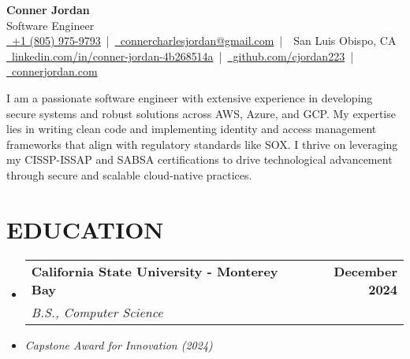 \documentclass[letterpaper,10pt]{article}
\makeatletter
\newcommand{\resumeSubHeadingListStart}{\begin{itemize}[leftmargin=0in,label={}]}
\newcommand{\resumeSubHeadingListEnd}{\end{itemize}}
\newcommand{\resumeSubheading}[4]{%
  \vspace{-2pt}\item
  \begin{tabular*}{\textwidth}[t]{l@{\extracolsep{\fill}}r}
    \textbf{\large #1} & \textbf{\small #2} \\
    \textit{\large #3} & \textit{\small #4} \\
  \end{tabular*}\vspace{-2pt}
}
\makeatother
\begin{document}
\begin{center}
  {\Huge \textbf{Conner Jordan}}\\[0pt]  %
  {\Large Software Engineer}\\[0pt]  %
  \href{tel:+18059759793}{\faPhone\ +1 (805) 975-9793} \,|\, 
  \href{mailto:connercharlesjordan@gmail.com}{\faEnvelope\ connercharlesjordan@gmail.com} \,|\, 
  \faMapMarker\ San Luis Obispo, CA \\[-2pt]  %
  \href{https://www.linkedin.com/in/conner-jordan-4b268514a/}{\faLinkedin\ linkedin.com/in/conner-jordan-4b268514a}
  \,|\, \href{https://github.com/cjordan223}{\faGithub\ github.com/cjordan223}
  \,|\, \href{https://connerjordan.com/}{\faGlobe\ connerjordan.com}
\end{center}

\vspace{4pt}  %

I am a passionate software engineer with extensive experience in developing secure systems and robust solutions across AWS, Azure, and GCP. My expertise lies in writing clean code and implementing identity and access management frameworks that align with regulatory standards like SOX. I thrive on leveraging my CISSP-ISSAP and SABSA certifications to drive technological advancement through secure and scalable cloud-native practices.  %

\section{EDUCATION}
\vspace{8pt}  %
\resumeSubHeadingListStart
  \resumeSubheading
    {California State University - Monterey Bay}{December 2024}
    {B.S., Computer Science}{}
  \item \small{\textit{Capstone Award for Innovation (2024)}}
\resumeSubHeadingListEnd
\vspace{6pt}  %

\end{document}

